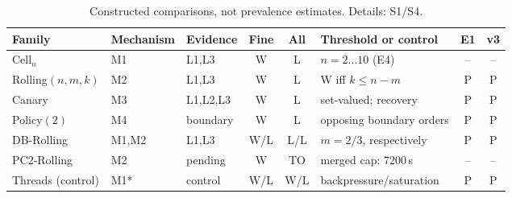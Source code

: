 \begin{table}[t]
\centering
\caption{Constructed comparisons, not prevalence estimates. Details: S1/S4.}
\label{tab:rq2-constructed}
\begingroup
\scriptsize
\setlength{\tabcolsep}{2.1pt}
\renewcommand{\arraystretch}{1.04}
\begin{tabular}{@{}lllcclcc@{}}
\toprule
Family & Mechanism & Evidence & Fine & All & Threshold or control & E1 & v3 \\
\midrule
Cell$_n$ & M1 & L1,L3 & W & L & $n=2\ldots10$ (E4) & -- & -- \\
Rolling$(n,m,k)$ & M2 & L1,L3 & W & L & W iff $k\le n-m$ & P & P \\
Canary & M3 & L1,L2,L3 & W & L & set-valued; recovery & P & P \\
Policy$(2)$ & M4 & boundary & W & L & opposing boundary orders & P & P \\
DB-Rolling & M1,M2 & L1,L3 & W/L & L/L & $m=2/3$, respectively & P & P \\
PC2-Rolling & M2 & pending & W & TO & merged cap: 7200\,s & -- & -- \\
Threads (control) & M1* & control & W/L & W/L & backpressure/saturation & P & P \\
\bottomrule
\end{tabular}
\endgroup
\par\vspace{2pt}{\scriptsize W/L: WIN/LOSS. All: transfers (Policy: boundaries). P: PASS; --: other validation scope (S1/S4). E1/v3: merge equivalence/independent game; *: idle/progress control. Rolling Fine/All: $k=1/n$.}
\end{table}
